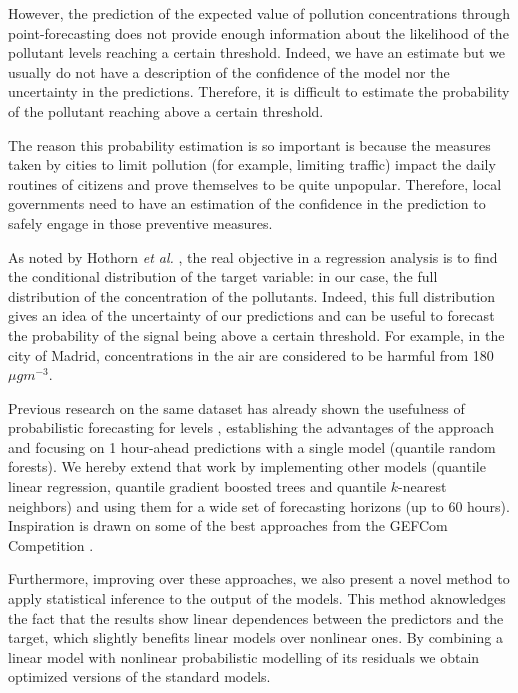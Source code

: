 \documentclass[a4paper,twocolumn,5p]{elsarticle}
\begin{document}
However, the prediction of the expected value of pollution
concentrations through point-forecasting does not provide enough
information about the likelihood of the pollutant levels reaching a
certain threshold. Indeed, we have an estimate but we usually do not
have a description of the confidence of the model nor the uncertainty
in the predictions. Therefore, it is difficult to estimate the
probability of the pollutant reaching above a certain threshold.

The reason this probability estimation is so important is because the
measures taken by cities to limit pollution (for example, limiting
traffic) impact the daily routines of citizens and prove themselves to
be quite unpopular.  Therefore, local governments need to have an
estimation of the confidence in the prediction to safely engage in
those preventive measures.


As noted by Hothorn \emph{et al.} \cite{hothorn_conditional_2014}, the
real objective in a regression analysis is to find the conditional
distribution of the target variable: in our case, the full
distribution of the concentration of the pollutants. Indeed, this full
distribution gives an idea of the uncertainty of our predictions and
can be useful to forecast the probability of the signal being above a
certain threshold. For example, in the city of Madrid, \no
concentrations in the air are considered to be harmful from 180
$\mu g m^{-3}$.

Previous research on the same dataset has already shown the usefulness
of probabilistic forecasting for \no levels \cite{proba_aznarte},
establishing the advantages of the approach and focusing on 1
hour-ahead predictions with a single model (quantile random
forests). We hereby extend that work by implementing other models
(quantile linear regression, quantile gradient boosted trees %
and quantile $k$-nearest neighbors) and using them for
a wide set of forecasting horizons (up to 60 hours). Inspiration is
drawn on some of the best approaches from the GEFCom Competition
\cite{mangalova_k-nearest_2016,hong_probabilistic_2016}.

Furthermore, improving over these approaches, we also present a novel
method to apply statistical inference to the output of the
models. This method aknowledges the fact that the results show linear
dependences between the predictors and the target, which slightly
benefits linear models over nonlinear ones. By combining a linear
model with nonlinear probabilistic modelling of its residuals we
obtain optimized versions of the standard models.
\end{document}
